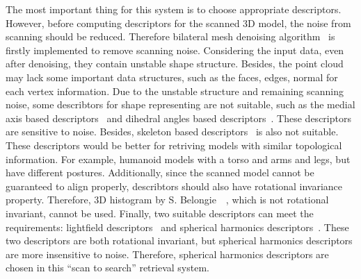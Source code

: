 The most important thing for this system is to choose appropriate descriptors. However, before computing descriptors for the scanned 3D model, the noise from scanning should be reduced. Therefore bilateral mesh denoising algorithm~\cite{fleishman2003bilateral} is firstly implemented to remove scanning noise. Considering the input data, even after denoising, they contain unstable shape structure. Besides, the point cloud may lack some important data structures, such as the faces, edges, normal for each vertex information. Due to the unstable structure and remaining scanning noise, some describtors for shape representing are not suitable, such as the medial axis based descriptors~\cite{kim2001graph} and dihedral angles based descriptors~\cite{gal2009iwires}. These descriptors are sensitive to noise. Besides, skeleton based descriptors~\cite{sundar2003skeleton} is also not suitable. These descriptors would be better for retriving models with similar topological information. For example, humanoid models with a torso and arms and legs, but have different postures. Additionally, since the scanned model cannot be guaranteed to align properly, describtors should also have rotational invariance property. Therefore, 3D histogram by S. Belongie~\etal~\cite{belongie2002shape}, which is not rotational invariant, cannot be used. Finally, two suitable descriptors can meet the requirements: lightfield descriptors~\cite{shen20033d} and spherical harmonics descriptors~\cite{Funkhouser:2003:SEM:588272.588279}. These two descriptors are both rotational invariant, but spherical harmonics descriptors are more insensitive to noise. Therefore, spherical harmonics descriptors are chosen in this ``scan to search'' retrieval system. 

